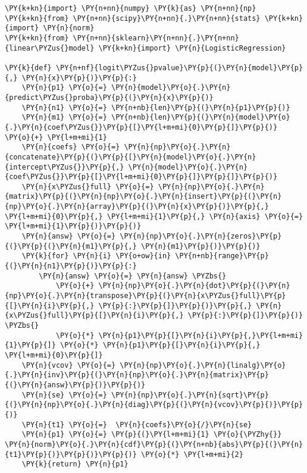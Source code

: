    

    
    \begin{tcolorbox}[breakable, size=fbox, boxrule=1pt, pad at break*=1mm,colback=cellbackground, colframe=cellborder]
\begin{Verbatim}[commandchars=\\\{\}]
\PY{k+kn}{import} \PY{n+nn}{numpy} \PY{k}{as} \PY{n+nn}{np}
\PY{k+kn}{from} \PY{n+nn}{scipy}\PY{n+nn}{.}\PY{n+nn}{stats} \PY{k+kn}{import} \PY{n}{norm}
\PY{k+kn}{from} \PY{n+nn}{sklearn}\PY{n+nn}{.}\PY{n+nn}{linear\PYZus{}model} \PY{k+kn}{import} \PY{n}{LogisticRegression}

\PY{k}{def} \PY{n+nf}{logit\PYZus{}pvalue}\PY{p}{(}\PY{n}{model}\PY{p}{,} \PY{n}{x}\PY{p}{)}\PY{p}{:}
    \PY{n}{p1} \PY{o}{=} \PY{n}{model}\PY{o}{.}\PY{n}{predict\PYZus{}proba}\PY{p}{(}\PY{n}{x}\PY{p}{)}
    \PY{n}{n1} \PY{o}{=} \PY{n+nb}{len}\PY{p}{(}\PY{n}{p1}\PY{p}{)}
    \PY{n}{m1} \PY{o}{=} \PY{n+nb}{len}\PY{p}{(}\PY{n}{model}\PY{o}{.}\PY{n}{coef\PYZus{}}\PY{p}{[}\PY{l+m+mi}{0}\PY{p}{]}\PY{p}{)} \PY{o}{+} \PY{l+m+mi}{1}
    \PY{n}{coefs} \PY{o}{=} \PY{n}{np}\PY{o}{.}\PY{n}{concatenate}\PY{p}{(}\PY{p}{[}\PY{n}{model}\PY{o}{.}\PY{n}{intercept\PYZus{}}\PY{p}{,} \PY{n}{model}\PY{o}{.}\PY{n}{coef\PYZus{}}\PY{p}{[}\PY{l+m+mi}{0}\PY{p}{]}\PY{p}{]}\PY{p}{)}
    \PY{n}{x\PYZus{}full} \PY{o}{=} \PY{n}{np}\PY{o}{.}\PY{n}{matrix}\PY{p}{(}\PY{n}{np}\PY{o}{.}\PY{n}{insert}\PY{p}{(}\PY{n}{np}\PY{o}{.}\PY{n}{array}\PY{p}{(}\PY{n}{x}\PY{p}{)}\PY{p}{,} \PY{l+m+mi}{0}\PY{p}{,} \PY{l+m+mi}{1}\PY{p}{,} \PY{n}{axis} \PY{o}{=} \PY{l+m+mi}{1}\PY{p}{)}\PY{p}{)}
    \PY{n}{answ} \PY{o}{=} \PY{n}{np}\PY{o}{.}\PY{n}{zeros}\PY{p}{(}\PY{p}{(}\PY{n}{m1}\PY{p}{,} \PY{n}{m1}\PY{p}{)}\PY{p}{)}
    \PY{k}{for} \PY{n}{i} \PY{o+ow}{in} \PY{n+nb}{range}\PY{p}{(}\PY{n}{n1}\PY{p}{)}\PY{p}{:}
        \PY{n}{answ} \PY{o}{=} \PY{n}{answ} \PYZbs{}
            \PY{o}{+} \PY{n}{np}\PY{o}{.}\PY{n}{dot}\PY{p}{(}\PY{n}{np}\PY{o}{.}\PY{n}{transpose}\PY{p}{(}\PY{n}{x\PYZus{}full}\PY{p}{[}\PY{n}{i}\PY{p}{,} \PY{p}{:}\PY{p}{]}\PY{p}{)}\PY{p}{,} \PY{n}{x\PYZus{}full}\PY{p}{[}\PY{n}{i}\PY{p}{,} \PY{p}{:}\PY{p}{]}\PY{p}{)} \PYZbs{}
            \PY{o}{*} \PY{n}{p1}\PY{p}{[}\PY{n}{i}\PY{p}{,}\PY{l+m+mi}{1}\PY{p}{]} \PY{o}{*} \PY{n}{p1}\PY{p}{[}\PY{n}{i}\PY{p}{,} \PY{l+m+mi}{0}\PY{p}{]}
    \PY{n}{vcov} \PY{o}{=} \PY{n}{np}\PY{o}{.}\PY{n}{linalg}\PY{o}{.}\PY{n}{inv}\PY{p}{(}\PY{n}{np}\PY{o}{.}\PY{n}{matrix}\PY{p}{(}\PY{n}{answ}\PY{p}{)}\PY{p}{)}
    \PY{n}{se} \PY{o}{=} \PY{n}{np}\PY{o}{.}\PY{n}{sqrt}\PY{p}{(}\PY{n}{np}\PY{o}{.}\PY{n}{diag}\PY{p}{(}\PY{n}{vcov}\PY{p}{)}\PY{p}{)}
    \PY{n}{t1} \PY{o}{=}  \PY{n}{coefs}\PY{o}{/}\PY{n}{se}  
    \PY{n}{p1} \PY{o}{=} \PY{p}{(}\PY{l+m+mi}{1} \PY{o}{\PYZhy{}} \PY{n}{norm}\PY{o}{.}\PY{n}{cdf}\PY{p}{(}\PY{n+nb}{abs}\PY{p}{(}\PY{n}{t1}\PY{p}{)}\PY{p}{)}\PY{p}{)} \PY{o}{*} \PY{l+m+mi}{2}
    \PY{k}{return} \PY{n}{p1}


\end{Verbatim}
\end{tcolorbox}
